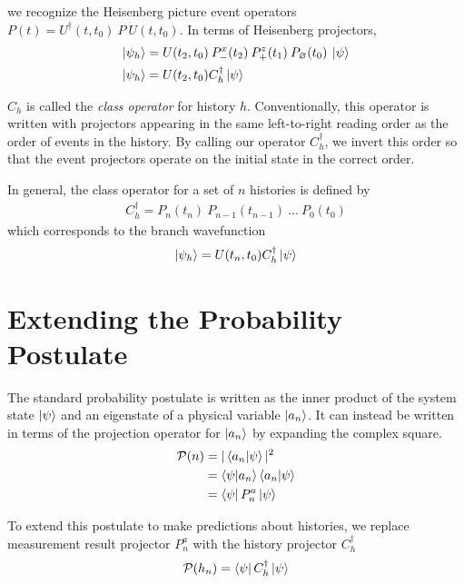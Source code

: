 we recognize the Heisenberg picture event operators ${P}(t) = U^\dagger(t, t_0) \: P \: U(t, t_0)$. In terms of Heisenberg projectors,
\begin{align}
  \ket{\psi_h} &= U(t_2, t_0) \: {P^x_-(t_2)} \: {P^z_+(t_1)} \: {P_\varnothing(t_0)} \: \ket{\psi} \\ \nonumber
  \ket{\psi_h} &= U(t_2, t_0) C_h^\dagger \ket{\psi}
\end{align}

$C_h$ is called the \textit{class operator} for history $h$.  Conventionally, this operator is written with projectors appearing in the same left-to-right reading order as the order of events in the history. By calling our operator $C_h^\dagger$, we invert this order so that the event projectors operate on the initial state in the correct order.

In general, the class operator for a set of $n$ histories is defined by
\begin{align}
  C_h^\dagger = P_n(t_n) \: P_{n-1}(t_{n-1}) \: ... \: P_0(t_0)
\end{align}
which corresponds to the branch wavefunction
\begin{align}
  \ket{\psi_h} = U(t_n, t_0) C_h^\dagger \ket{\psi}
\end{align}

\section{Extending the Probability Postulate}

The standard probability postulate is written as the inner product of the system state $\ket{\psi}$ and an eigenstate of a physical variable $\ket{a_n}$. It can instead be written in terms of the projection operator for $\ket{a_n}$ by expanding the complex square.
\begin{align}
        \mathcal{P}(n) &= |\braket{a_n|\psi}|^2 \\ \nonumber
        &= \braket{\psi|a_n} \braket{a_n|\psi} \\ \nonumber
        &= \bra{\psi} P^a_n \ket{\psi}
\end{align}

To extend this postulate to make predictions about histories, we replace measurement result projector $P^a_n$ with the history projector $C_h^\dagger$
\begin{align}
  \mathcal{P}(h_n) = \bra{\psi} C_h^\dagger \ket{\psi}
\end{align}

